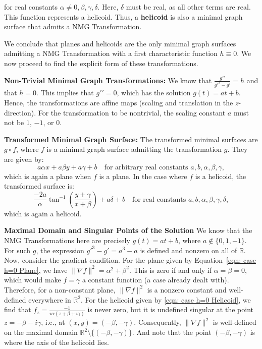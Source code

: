 \documentclass[12pt]{article}
\theoremstyle{plain}
\theoremstyle{definition}
\theoremstyle{remark}
\begin{document}
   for real constants \(\alpha \neq 0, \beta, \gamma, \delta\). Here, \(\delta\) must be real, as all other terms are real. This function represents a helicoid. Thus, a \textbf{helicoid} is also a minimal graph surface that admits a NMG Transformation.
   
   We conclude that planes and helicoids are the only minimal graph surfaces admitting a NMG Transformation with a first characteristic function \(h \equiv 0\). We now proceed to find the explicit form of these transformations.

   \textbf{Non-Trivial Minimal Graph Transformations:} We know that \(\frac{g\prime\prime}{g\prime^3 - g\prime} = h\) and that \(h=0\). This implies that \(g\prime\prime=0\), which has the solution \(g(t)=at+b\). Hence, the transformations are affine maps (scaling and translation in the \(z\)-direction). For the transformation to be nontrivial, the scaling constant \(a\) must not be \(1\), \(-1\), or \(0\).

   \textbf{Transformed Minimal Graph Surface:} The transformed minimal surfaces are \(g \circ f\), where \(f\) is a minimal graph surface admitting the transformation \(g\). They are given by:
   \[
     a\alpha x + a\beta y + a\gamma + b \quad \text{for arbitrary real constants } a, b, \alpha, \beta, \gamma,
   \]
   which is again a plane when \(f\) is a plane. In the case where \(f\) is a helicoid, the transformed surface is:
   \[
    \frac{-2a}{\alpha}\tan^{-1}\left(\frac{y+\gamma}{x+\beta}\right) + a\delta + b \quad \text{for real constants } a, b, \alpha, \beta, \gamma, \delta,
  \]
  which is again a helicoid.

  \textbf{Maximal Domain and Singular Points of the Solution} We know that the NMG Transformations here are precisely \(g(t)=at+b\), where \(a \notin \{0, 1, -1\}\). For such \(g\), the expression \(g\prime^3 - g\prime = a^3 - a\) is defined and nonzero on all of \(\mathbb{R}\). Now, consider the gradient condition. For the plane given by Equation~\ref{eqn: case h=0 Plane}, we have \(\|\nabla f\|^2 = \alpha^2 + \beta^2\). This is zero if and only if \(\alpha = \beta = 0\), which would make \(f = \gamma\) a constant function (a case already dealt with). Therefore, for a non-constant plane, \(\|\nabla f\|^2\) is a nonzero constant and well-defined everywhere in \(\mathbb{R}^2\). For the helicoid given by \ref{eqn: case h=0 Helicoid}, we find that \(f_z = \frac{-1}{i\alpha(z + \beta + i\gamma)}\) is never zero, but it is undefined singular at the point \(z = -\beta - i\gamma\), i.e., at \((x, y) = (-\beta, -\gamma)\). Consequently, \(\|\nabla f\|^2\) is well-defined on the maximal domain \(\mathbb{R}^2 \setminus \{(-\beta, -\gamma)\}\). And note that the point \((-\beta, -\gamma)\) is where the axis of the helicoid lies.
  
\end{document}
